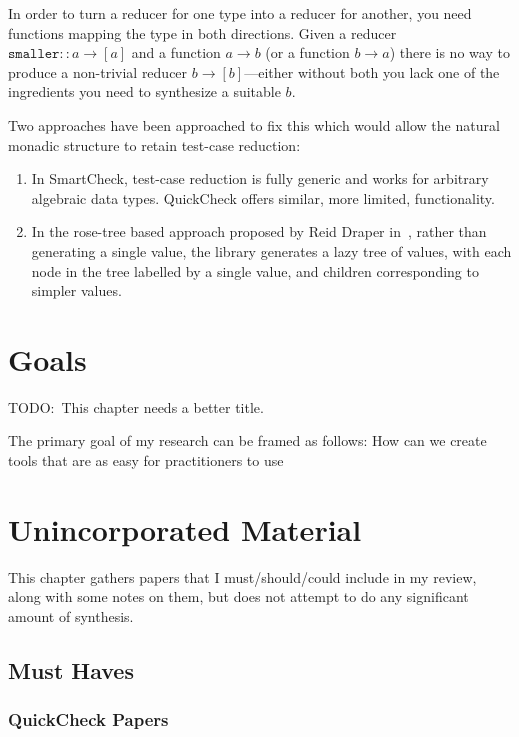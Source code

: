 In order to turn a reducer for one type into a reducer for another,
you need functions mapping the type in both directions.
Given a reducer \(\texttt{smaller} :: a \to [a]\) and a function \(a \to b\) (or a function \(b \to a\)) there is no way to produce a non-trivial reducer \(b \to [b]\)---either
without both you lack one of the ingredients you need to synthesize a suitable \(b\).

Two approaches have been approached to fix this which would allow the natural monadic structure to retain test-case reduction:

\begin{enumerate}
\item In SmartCheck\cite{DBLP:conf/haskell/Pike14},
test-case reduction is fully generic and works for arbitrary algebraic data types.
QuickCheck offers similar,
more limited,
functionality.
\item In the rose-tree based approach proposed by Reid Draper in~\cite{FreeShrinking},
rather than generating a single value,
the library generates a lazy tree of values,
with each node in the tree labelled by a single value,
and children corresponding to simpler values.
\end{enumerate}

\chapter{Goals}

TODO:\ This chapter needs a better title.

The primary goal of my research can be framed as follows:
How can we create tools that are as easy for practitioners to use 

\chapter{Unincorporated Material}

This chapter gathers papers that I must/should/could include in my review,
along with some notes on them,
but does not attempt to do any significant amount of synthesis.

\section{Must Haves}

\subsection{QuickCheck Papers}

